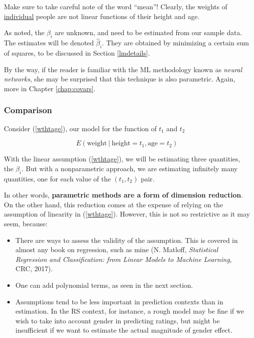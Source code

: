 Make sure to take careful note of the word ``mean''!  Clearly, the
weights of \underline{individual} people are not linear functions of
their height and age.

As noted, the $\beta_i$ are unknown, and need to be estimated
from our sample data.  The estimates will be denoted
$\widehat{\beta}_i$.  They are obtained by minimizing a certain sum of
squares, to be discussed in Section \ref{lmdetails}.

By the way, if the reader is familiar with the ML methodology known as
\textit{neural networks}, she may be surprised that this technique is
also parametric.  Again, more in Chapter \ref{chap:covars}.

\subsubsection{Comparison}

Consider (\ref{wthtage}), our model for the function of $t_1$ and $t_2$

\begin{equation}
E(\textrm{weight} ~|~ \textrm{height} = t_1, \textrm{age} = t_2)
\end{equation}


With the linear assumption (\ref{wthtage}), we will be estimating three
quantities, the $\beta_i$.  But with a nonparametric approach, we are
estimating infinitely many quantities, one for each value of the
$(t_1,t_2)$ pair.

In other words, \textbf{parametric methods are a form of dimension reduction}.
On the other hand, this reduction comes at the expense of relying on the
assumption of linearity in (\ref{wthtage}).  However, this is not so
restrictive as it may seem, because:

\begin{itemize}

\item There are ways to assess the validity of the assumption.  This is
covered in almost any book on regression, such as mine
(N. Matloff, \textit{Statistical Regression and Classification: from
Linear Models to Machine Learning}, CRC, 2017).

\item One can add polynomial terms, as seen in the next section.

\item Assumptions tend to be less important in prediction contexts than
in estimation.  In the RS context, for instance, a rough model may be
fine if we wish to take into account gender in predicting ratings, but
might be insufficient if we want to estimate the actual magnitude of
gender effect.

\end{itemize} 

